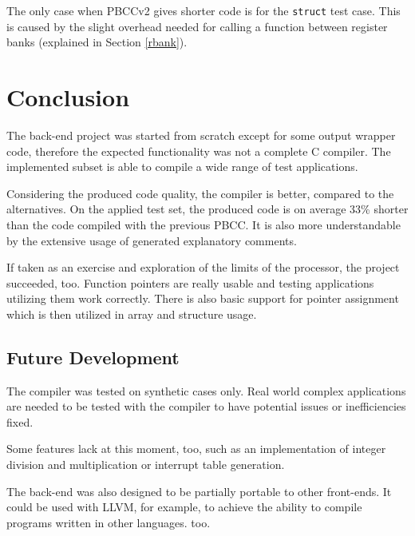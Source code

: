     The only case when PBCCv2 gives shorter code is for the \texttt{struct} test case. This is caused by the slight overhead needed for calling a function between register banks (explained in Section \ref{rbank}).

\chapter{Conclusion}\label{conclusion}

The back-end project was started from scratch except for some output wrapper code, therefore the expected functionality was not a complete C compiler. The implemented subset is able to compile a wide range of test applications.

Considering the produced code quality, the compiler is better, compared to the alternatives. On the applied test set, the produced code is on average 33\% shorter than the code compiled with the previous PBCC. It is also more understandable by the extensive usage of generated explanatory comments.

If taken as an exercise and exploration of the limits of the processor, the project succeeded, too. Function pointers are really usable and testing applications utilizing them work correctly. There is also basic support for pointer assignment which is then utilized in array and structure usage.

\section{Future Development}

The compiler was tested on synthetic cases only. Real world complex applications are needed to be tested with the compiler to have potential issues or inefficiencies fixed.

Some features lack at this moment, too, such as an implementation of integer division and multiplication or interrupt table generation.

The back-end was also designed to be partially portable to other front-ends. It could be used with LLVM, for example, to achieve the ability to compile programs written in other languages. too.

